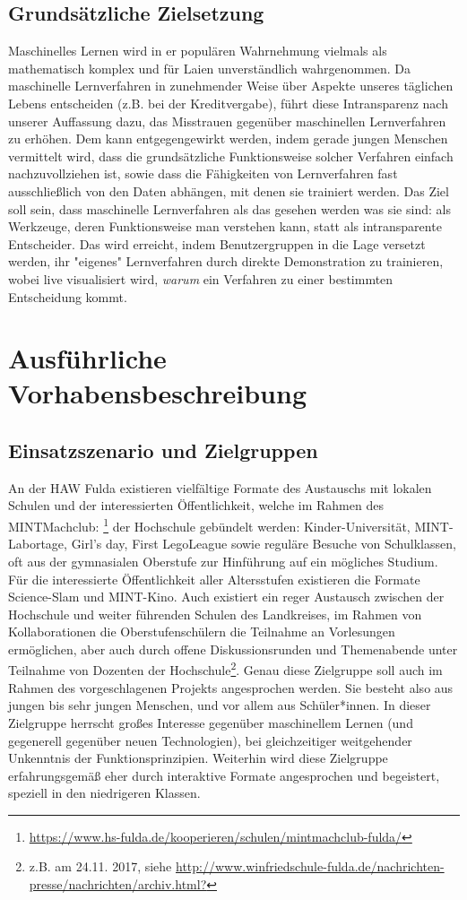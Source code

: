 \documentclass[11pt]{article}
\begin{document}
\subsection{Grundsätzliche Zielsetzung}
%
Maschinelles Lernen wird in er populären Wahrnehmung vielmals als mathematisch komplex und für Laien unverständlich wahrgenommen. Da maschinelle Lernverfahren in zunehmender Weise über Aspekte unseres täglichen Lebens entscheiden (z.B. bei der Kreditvergabe), führt diese Intransparenz nach unserer Auffassung dazu, das Misstrauen gegenüber maschinellen Lernverfahren zu erhöhen. Dem kann entgegengewirkt werden, indem gerade jungen Menschen vermittelt wird, dass
die grundsätzliche Funktionsweise solcher Verfahren einfach nachzuvollziehen ist, sowie dass die Fähigkeiten von Lernverfahren fast ausschließlich von den Daten abhängen, mit denen sie trainiert werden. Das Ziel soll sein, dass maschinelle Lernverfahren als das gesehen werden was sie sind: als Werkzeuge, deren Funktionsweise man verstehen kann, statt als intransparente Entscheider.
Das wird erreicht, indem Benutzergruppen in die Lage versetzt werden, ihr "eigenes" Lernverfahren durch direkte Demonstration zu trainieren, wobei live visualisiert wird, {\it warum} ein Verfahren zu einer bestimmten Entscheidung kommt.
%
\renewcommand{\thesection}{4}
\section{Ausführliche Vorhabensbeschreibung}\label{sec:besch}
\subsection{Einsatzszenario und Zielgruppen}\label{sec:zg}
%
An der HAW Fulda existieren vielfältige Formate des Austauschs mit lokalen Schulen und der interessierten Öffentlichkeit, welche im Rahmen des MINTMachclub: \footnote{\url {https://www.hs-fulda.de/kooperieren/schulen/mintmachclub-fulda/}} der Hochschule gebündelt werden: Kinder-Universität, MINT-Labortage, Girl's day, First LegoLeague sowie reguläre Besuche von Schulklassen, oft aus der gymnasialen Oberstufe zur Hinführung auf ein mögliches Studium. Für die interessierte Öffentlichkeit aller Altersstufen existieren die Formate Science-Slam und MINT-Kino. Auch existiert ein reger Austausch zwischen der Hochschule und weiter führenden Schulen des Landkreises, im Rahmen von Kollaborationen die Oberstufenschülern die Teilnahme an Vorlesungen ermöglichen, aber auch durch offene Diskussionsrunden und Themenabende unter Teilnahme von Dozenten der Hochschule\footnote{z.B. am 24.11. 2017, siehe \url{http://www.winfriedschule-fulda.de/nachrichten-presse/nachrichten/archiv.html?}}. Genau diese Zielgruppe soll auch im Rahmen des vorgeschlagenen Projekts angesprochen werden. Sie besteht also aus jungen bis sehr jungen Menschen, und vor allem aus Schüler*innen. In dieser Zielgruppe herrscht großes Interesse gegenüber maschinellem Lernen (und gegenerell gegenüber neuen Technologien), bei gleichzeitiger weitgehender Unkenntnis der Funktionsprinzipien.
Weiterhin wird diese Zielgruppe erfahrungsgemäß eher durch interaktive Formate angesprochen und begeistert, speziell in den niedrigeren Klassen.
\end{document}
